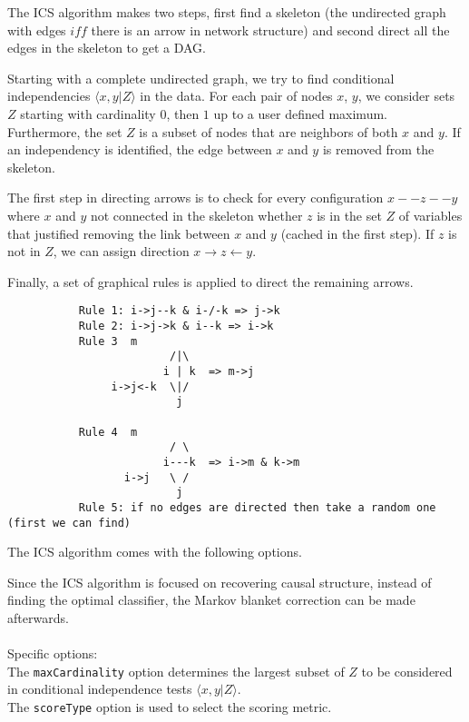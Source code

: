 The ICS algorithm makes two steps, first find a skeleton (the undirected graph with edges $iff$ there
is an arrow in network structure) and second direct all the edges in the skeleton
to get a DAG.

Starting with a complete undirected graph, we try to find conditional independencies
$\langle x,y|Z\rangle$ in the data. For each pair of nodes $x$, $y$, we consider sets
$Z$ starting with cardinality $0$, then $1$ up to a user defined maximum. Furthermore,
the set $Z$ is a subset of nodes that are neighbors of both $x$ and $y$. If an
independency is identified, the edge between $x$ and $y$ is removed from the skeleton.

The first step in directing arrows is to check for every configuration $x--z--y$
where $x$ and $y$ not connected in the skeleton whether $z$ is in the set $Z$ of
variables that justified removing the link between $x$ and $y$ (cached in the
first step). If $z$ is not in $Z$, we can assign direction $x\to z\leftarrow y$.

Finally, a set of graphical rules is applied \cite{verma} to direct the remaining
arrows.
\begin{verbatim}
           Rule 1: i->j--k & i-/-k => j->k
           Rule 2: i->j->k & i--k => i->k
           Rule 3  m
                         /|\
                        i | k  => m->j
                i->j<-k  \|/
                          j
        
           Rule 4  m
                         / \
                        i---k  => i->m & k->m
                  i->j   \ /
                          j
           Rule 5: if no edges are directed then take a random one (first we can find)
\end{verbatim}

The ICS algorithm comes with the following options.

\begin{center}
\end{center}

Since the ICS algorithm is focused on recovering causal structure, instead of 
finding the optimal classifier, the Markov blanket correction can be made 
afterwards.\\
\\
Specific options:\\
The {\tt maxCardinality} option determines the largest subset of $Z$ to be 
considered in conditional independence tests $\langle x,y|Z\rangle$. \\
The {\tt scoreType} option is used to select the scoring metric.

